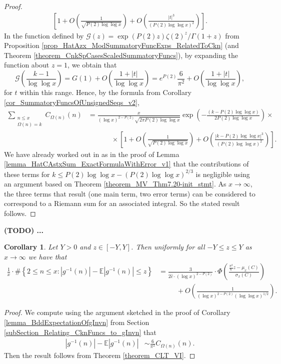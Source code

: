 \documentclass[11pt,reqno,a4letter]{article}
\numberwithin{figure}{section}
\numberwithin{table}{section}
\theoremstyle{plain}
\newtheorem{cor}[theorem]{Corollary}
\numberwithin{theorem}{section}
\theoremstyle{definition}
\begin{document}
\begin{proof}
\begin{align*}
     \left[1 + 
     O\left(\frac{1}{\sqrt{P(2) \log\log x}}\right) + 
     O\left(\frac{|t|^3}{(P(2) \log\log x)^2}\right)\right]. 
\end{align*} 
In the function defined by $\mathcal{G}(z) = \exp(P(2)z) \zeta(2)^{z} / \Gamma(1+z)$ from 
Proposition \ref{prop_HatAzx_ModSummatoryFuncExps_RelatedToCkn} 
(and Theorem \ref{theorem_CnkSpCasesScaledSummatoryFuncs}), by expanding the function about 
$z = 1$, we obtain that 
\[
\mathcal{G}\left(\frac{k-1}{\log\log x}\right) = G(1) + O\left(\frac{1+|t|}{\log\log x}\right) = 
     e^{P(2)} \frac{6}{\pi^2} + O\left(\frac{1+|t|}{\log\log x}\right), 
\]
for $t$ within this range. 
Hence, by the formula from Corollary \ref{cor_SummatoryFuncsOfUnsignedSeqs_v2}, 
\begin{align*}
\sum_{\substack{n \leq x \\ \Omega(n)=k}} C_{\Omega(n)}(n) & = 
     \frac{x}{(\log x)^{2-P(2)} \sqrt{2\pi P(2) \log\log x}} \exp\left(- 
     \frac{(k-P(2)\log\log x)}{2P(2)\log\log x}\right) \times \\ 
     & \phantom{=\qquad} \times 
     \left[ 
     1 + O\left(\frac{1}{\sqrt{P(2) \log\log x}}\right) + 
     O\left(\frac{|k-P(2)\log\log x|^3}{(P(2) \log\log x)^2}\right)\right]. 
\end{align*} 
We have already worked out in as in the proof of 
Lemma \ref{lemma_HatCAstxSum_ExactFormulaWithError_v1} that 
the contributions of these terms for $k \leq P(2)\log\log x - (P(2)\log\log x)^{2/3}$ 
is negligible using an argument based on Theorem \ref{theorem_MV_Thm7.20-init_stmt}. 
As $x \rightarrow \infty$, the three terms that result (one main term, two error terms) 
can be considered to correspond to a Riemann sum for an associated integral. 
So the stated result follows. 
\end{proof} 

\textbf{(TODO) ... } 

\begin{cor} 
\label{cor_CLT_VII} 
Let $Y > 0$ and $z \in [-Y, Y]$. 
Then uniformly for all $-Y \leq z \leq Y$ as $x \rightarrow \infty$ 
we have that 
\begin{align*} 
\frac{1}{x} \cdot \#\left\{2 \leq n \leq x:|g^{-1}(n)| - 
     \mathbb{E}|g^{-1}(n)| \leq z\right\} & = 
     \frac{3}{2\widehat{c} \cdot (\log x)^{2-P(2)}} \cdot 
     \Phi\left(\frac{\frac{\pi^2}{6} z - \mu_x(C)}{\sigma_x(C)}\right) \\ 
     & \phantom{=\quad\ } + 
     O\left(\frac{1}{(\log x)^{2-P(2)} (\log\log x)^{1/2}}\right). 
\end{align*} 
\end{cor} 
\begin{proof} 
We compute using the argument sketched in the proof of 
Corollary \ref{lemma_BddExpectationOfgInvn} from 
Section \ref{subSection_Relating_CknFuncs_to_gInvn} that 
\begin{align*} 
|g^{-1}(n)| - \mathbb{E}|g^{-1}(n)| & \sim \frac{6}{\pi^2} C_{\Omega(n)}(n). 
\end{align*} 
Then the result follows from Theorem \ref{theorem_CLT_VI}. 
\end{proof} 
\end{document}
